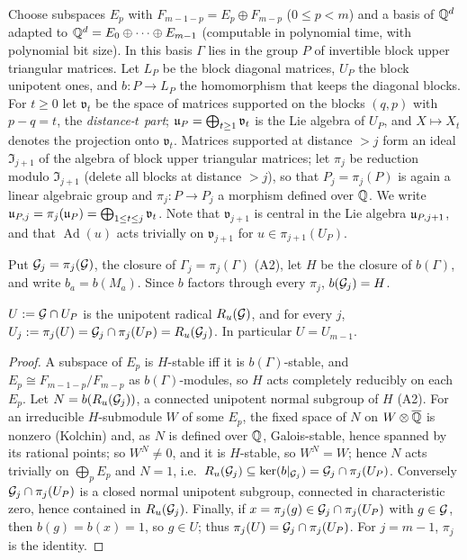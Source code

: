 Choose subspaces $E_p$ with $F_{m-1-p}=E_p\oplus F_{m-p}$ ($0\le p<m$) and a basis of $\mathbb{Q}^d$
adapted to $\mathbb{Q}^d=E_0\oplus\cdots\oplus E_{m-1}$ (computable in polynomial time, with polynomial
bit size). In this basis $\Gamma$ lies in the group $P$ of invertible block upper triangular
matrices. Let $L_P$ be the block diagonal matrices, $U_P$ the block unipotent ones, and
$b:P\to L_P$ the homomorphism that keeps the diagonal blocks. For $t\ge0$ let $\mathfrak v_t$ be the
space of matrices supported on the blocks $(q,p)$ with $p-q=t$, the \emph{distance-$t$ part};
$\mathfrak{u}_P=\bigoplus_{t\ge1}\mathfrak v_t$ is the Lie algebra of $U_P$, and
$X\mapsto X_t$ denotes the projection onto $\mathfrak v_t$. Matrices supported at distance
$>j$ form an ideal $\mathfrak I_{j+1}$ of the algebra of block upper triangular matrices; let
$\pi_j$ be reduction modulo $\mathfrak I_{j+1}$ (delete all blocks at distance $>j$), so that
$P_j=\pi_j(P)$ is again a linear algebraic group and $\pi_j:P\to P_j$ a morphism defined over
$\mathbb{Q}$. We write $\mathfrak{u}_{P,j}=\pi_j(\mathfrak{u}_P)=\bigoplus_{1\le t\le j}\mathfrak v_t$. Note that
$\mathfrak v_{j+1}$ is central in the Lie algebra $\mathfrak{u}_{P,j+1}$, and that $\operatorname{Ad}(u)$
acts trivially on $\mathfrak v_{j+1}$ for $u\in\pi_{j+1}(U_P)$.

Put $\mathcal{G}_j=\pi_j(\mathcal{G})$, the closure of $\Gamma_j=\pi_j(\Gamma)$ (A2), let $H$ be the closure of
$b(\Gamma)$, and write $b_a=b(M_a)$. Since $b$ factors through every $\pi_j$, $b(\mathcal{G}_j)=H$.

\begin{lemma}\label{lem:radical}
$U:=\mathcal{G}\cap U_P$ is the unipotent radical $R_u(\mathcal{G})$, and for every $j$,
$U_j:=\pi_j(U)=\mathcal{G}_j\cap\pi_j(U_P)=R_u(\mathcal{G}_j)$. In particular $U=U_{m-1}$.
\end{lemma}
\begin{proof}
A subspace of $E_p$ is $H$-stable iff it is $b(\Gamma)$-stable, and $E_p\cong F_{m-1-p}/F_{m-p}$ as
$b(\Gamma)$-modules, so $H$ acts completely reducibly on each $E_p$. Let $N=b(R_u(\mathcal{G}_j))$, a connected
unipotent normal subgroup of $H$ (A2). For an irreducible $H$-submodule $W$ of some $E_p$, the fixed
space of $N$ on $W\otimes\overline{\mathbb{Q}}$ is nonzero (Kolchin) and, as $N$ is defined over $\mathbb{Q}$, Galois-stable,
hence spanned by its rational points; so $W^N\ne0$, and it is $H$-stable, so $W^N=W$; hence $N$ acts trivially on
$\bigoplus_pE_p$ and $N=1$, i.e.\ $R_u(\mathcal{G}_j)\subseteq\ker(b|_{\mathcal{G}_j})=\mathcal{G}_j\cap\pi_j(U_P)$.
Conversely $\mathcal{G}_j\cap\pi_j(U_P)$ is a closed normal unipotent subgroup, connected in
characteristic zero, hence contained in $R_u(\mathcal{G}_j)$. Finally, if $x=\pi_j(g)\in\mathcal{G}_j\cap\pi_j(U_P)$
with $g\in\mathcal{G}$, then $b(g)=b(x)=1$, so $g\in U$; thus $\pi_j(U)=\mathcal{G}_j\cap\pi_j(U_P)$. For $j=m-1$,
$\pi_j$ is the identity.
\end{proof}

